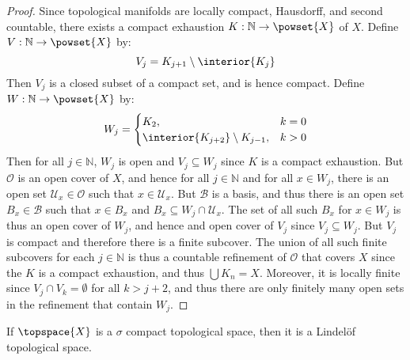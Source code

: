 \documentclass{article}                                                        %
\begin{document}
            \begin{proof}
                Since topological manifolds are locally compact, Hausdorff, and
                second countable, there exists a compact exhaustion
                $K:\mathbb{N}\rightarrow\powset{X}$ of $X$. Define
                $V:\mathbb{N}\rightarrow\powset{X}$ by:
                \begin{equation}
                    V_{j}=K_{j+1}\setminus\interior{K_{j}}
                \end{equation}
                Then $V_{j}$ is a closed subset of a compact set, and is hence
                compact. Define $W:\mathbb{N}\rightarrow\powset{X}$ by:
                \begin{equation}
                    W_{j}=
                    \begin{cases}
                        K_{2},&k=0\\
                        \interior{K_{j+2}}\setminus{K}_{j-1},&k>0
                    \end{cases}
                \end{equation}
                Then for all $j\in\mathbb{N}$, $W_{j}$ is open and
                $V_{j}\subseteq{W}_{j}$ since $K$ is a compact exhaustion. But
                $\mathcal{O}$ is an open cover of $X$, and hence for all
                $j\in\mathbb{N}$ and for all $x\in{W}_{j}$, there is an open
                set $\mathcal{U}_{x}\in\mathcal{O}$ such that
                $x\in\mathcal{U}_{x}$. But $\mathcal{B}$ is a basis, and thus
                there is an open set $B_{x}\in\mathcal{B}$ such that
                $x\in{B}_{x}$ and $B_{x}\subseteq{W}_{j}\cap\mathcal{U}_{x}$.
                The set of all such $B_{x}$ for $x\in{W}_{j}$ is thus an open
                cover of $W_{j}$, and hence and open cover of $V_{j}$ since
                $V_{j}\subseteq{W}_{j}$. But $V_{j}$ is compact and therefore
                there is a finite subcover. The union of all such finite
                subcovers for each $j\in\mathbb{N}$ is thus a countable
                refinement of $\mathcal{O}$ that covers $X$ since the $K$ is a
                compact exhaustion, and thus $\bigcup{K}_{n}=X$. Moreover, it is
                locally finite since $V_{j}\cap{V}_{k}=\emptyset$ for all
                $k>j+2$, and thus there are only finitely many open sets in the
                refinement that contain $W_{j}$.
            \end{proof}
            \begin{theorem}
                If $\topspace{X}$ is a $\sigma$ compact topological space, then
                it is a Lindel\"{o}f topological space.
            \end{theorem}
\end{document}
